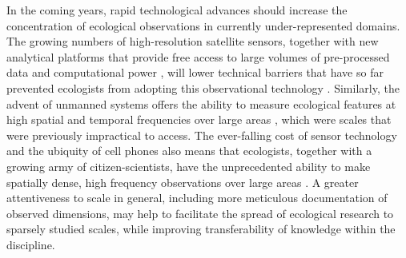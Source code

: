 \documentclass[12pt]{article}
\begin{document}
In the coming years, rapid technological advances should increase the concentration of ecological observations in currently under-represented domains. The growing numbers of high-resolution satellite sensors, together with new analytical platforms that provide free access to large volumes of pre-processed data and computational power \cite{googleearthengine}, will lower technical barriers that have so far prevented ecologists from adopting this observational technology  \cite{pettorelli_satellite_2014}. Similarly, the advent of unmanned systems offers the ability to measure ecological features at high spatial and temporal frequencies over large areas \cite{anderson_lightweight_2013}, which were scales that were previously impractical to access. The ever-falling cost of sensor technology and the ubiquity of cell phones also means that ecologists, together with a growing army of citizen-scientists, have the unprecedented ability to make spatially dense, high frequency observations over large areas \cite{wolf_gsm-based_2012,collins_new_2006,porter_wireless_2005,dickinson_current_2012}.  A greater attentiveness to scale in general, including more meticulous documentation of observed dimensions, may help to facilitate the spread of ecological research to sparsely studied scales, while improving transferability of knowledge within the discipline.  


\end{document}
